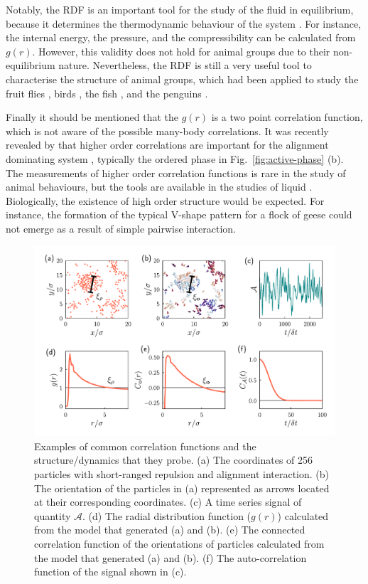\documentclass[11pt,twoside]{report}
\begin{document}
Notably, the RDF is an important tool for the study of the fluid in equilibrium, because it determines the thermodynamic behaviour of the system \cite{pathria2011, hansen2013}. For instance, the internal energy, the pressure, and the compressibility can be calculated from $g(r)$. However, this validity does not hold for animal groups due to their non-equilibrium nature. Nevertheless, the RDF is still a very useful tool to characterise the structure of animal groups, which had been  applied to study the fruit flies \cite{mendez-valderrama2018}, birds \cite{cavagna2008}, the fish \cite{romenskyy2017}, and the penguins \cite{gerum2018}.

Finally it should be mentioned that the $g(r)$ is a two point correlation function, which is not aware of the possible many-body correlations. It was recently revealed by \citeauthor{kursten2020} that higher order correlations are important for the alignment dominating system \cite{kursten2020}, typically the ordered phase in Fig.~\ref{fig:active-phase} (b). The measurements of higher order correlation functions is rare in the study of animal behaviours, but the tools are available in the studies of liquid \cite{zahn2003, williams2007, hallett2020}.
Biologically, the existence of high order structure would be expected. For instance, the formation of the typical V-shape pattern \cite{Hayakawa2013} for a flock of geese could not emerge as a result of simple pairwise interaction.


\begin{figure}
  \includegraphics[width=\linewidth]{correlations}
  \caption[Examples of common correlation functions]{
  Examples of common correlation functions and the structure/dynamics that they probe.
  (a) The coordinates of 256 particles with short-ranged repulsion and alignment interaction.
  (b) The orientation of the particles in (a) represented as arrows located at their corresponding coordinates.
  (c) A time series signal of quantity $\mathcal{A}$.
  (d) The radial distribution function ($g(r)$) calculated from the model that generated (a) and (b).
  (e) The connected correlation function of the orientations of particles calculated from the model that generated (a) and (b).
  (f) The auto-correlation function of the signal shown in (c).
  }
  \label{fig:corr-examples}
\end{figure}
\end{document}
